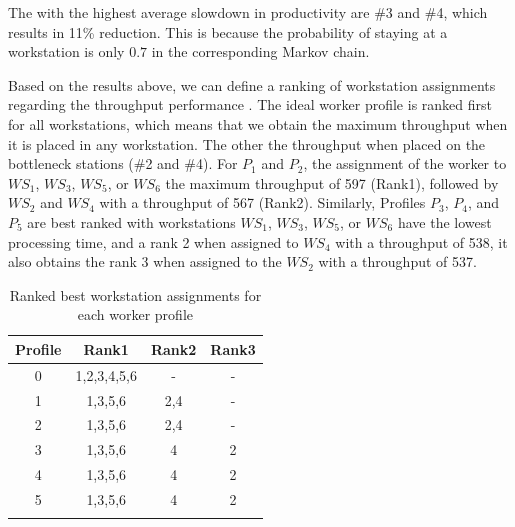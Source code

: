 \documentclass[review,12pt, 3p, times]{elsarticle}
\begin{document}
The  with the highest average slowdown in productivity are \#3 and \#4, which results in 11\% reduction. This is because the probability of staying at a workstation is only $0.7$ in the corresponding Markov chain.

Based on the results above, we can define  a ranking of workstation assignments regarding the throughput performance . The ideal worker profile is ranked first for all workstations, which means that we obtain the maximum throughput when it is placed in any workstation. The other     the throughput when  placed on the bottleneck stations (\#2 and \#4). For  $P_1$ and $P_2$, the assignment of the worker to $\textit{WS}_1$, $\textit{WS}_3$, $\textit{WS}_5$, or $\textit{WS}_6$ the maximum throughput of 597 (Rank1), followed by  $\textit{WS}_2$ and  $\textit{WS}_4$ with a throughput of 567 (Rank2).  Similarly, Profiles $P_3$, $P_4$, and $P_5$ are best ranked with workstations $\textit{WS}_1$, $\textit{WS}_3$, $\textit{WS}_5$, or $\textit{WS}_6$ have the lowest processing time, and  a rank 2 when assigned to $\textit{WS}_4$ with a throughput of 538, it also obtains the rank 3 when assigned to the $\textit{WS}_2$ with a throughput of 537.

\begin{table}[h!]
	\begin{center}
		\caption{Ranked best workstation assignments for each worker profile}\label{tab:t2}
		\begin{tabular}{cccc}
					Profile & Rank1 & Rank2 & Rank3  \\\hline
					0       & 1,2,3,4,5,6 & -       & -   \\ 
					1       & 1,3,5,6    & 2,4      & -   \\ 
					2       & 1,3,5,6    & 2,4      & -   \\ 
					3       & 1,3,5,6   & 4         & 2   \\ 
					4       & 1,3,5,6   & 4       & 2   \\
					5       & 1,3,5,6    & 4        & 2    \\ \hline
					\\
				\end{tabular}
	\end{center}
\end{table}
\end{document}
